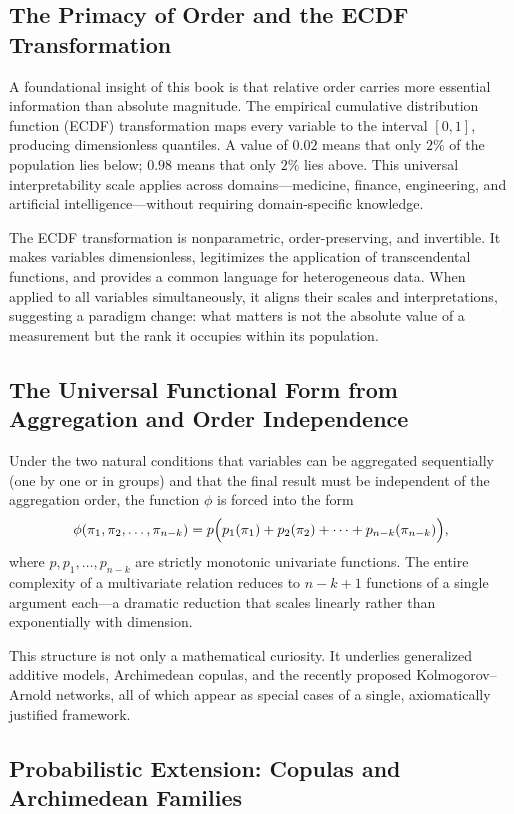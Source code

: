 \subsection{The Primacy of Order and the ECDF Transformation}

A foundational insight of this book is that relative order carries more essential information than absolute magnitude. The empirical cumulative distribution function (ECDF) transformation maps every variable to the interval \([0,1]\), producing dimensionless quantiles. A value of \(0.02\) means that only \(2\%\) of the population lies below; \(0.98\) means that only \(2\%\) lies above. This universal interpretability scale applies across domains—medicine, finance, engineering, and artificial intelligence—without requiring domain-specific knowledge.

The ECDF transformation is nonparametric, order-preserving, and invertible. It makes variables dimensionless, legitimizes the application of transcendental functions, and provides a common language for heterogeneous data. When applied to all variables simultaneously, it aligns their scales and interpretations, suggesting a paradigm change: what matters is not the absolute value of a measurement but the rank it occupies within its population.

\subsection{The Universal Functional Form from Aggregation and Order Independence}

Under the two natural conditions that variables can be aggregated sequentially (one by one or in groups) and that the final result must be independent of the aggregation order, the function \(\phi\) is forced into the form
\[
\phi(\pi_1,\pi_2,\dots,\pi_{n-k}) = p\Bigl(p_1(\pi_1)+p_2(\pi_2)+\cdots+p_{n-k}(\pi_{n-k})\Bigr),
\]
where \(p,p_1,\dots,p_{n-k}\) are strictly monotonic univariate functions. The entire complexity of a multivariate relation reduces to \(n-k+1\) functions of a single argument each—a dramatic reduction that scales linearly rather than exponentially with dimension.

This structure is not only a mathematical curiosity. It underlies generalized additive models, Archimedean copulas, and the recently proposed Kolmogorov–Arnold networks, all of which appear as special cases of a single, axiomatically justified framework.

\subsection{Probabilistic Extension: Copulas and Archimedean Families}

